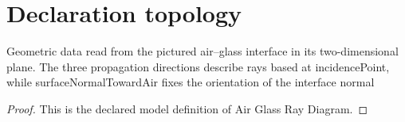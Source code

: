 \section{Declaration topology}
\begin{definition}
  \label{def:physics:phyx-mini-0007:phyxminiproblems-problemphyxmini0007-airglassraydiagram}
  Geometric data read from the pictured air--glass interface in its two-dimensional plane. The three propagation directions describe rays based at incidencePoint, while surfaceNormalTowardAir fixes the orientation of the interface normal
\end{definition}
\begin{proof}
  This is the declared model definition of Air Glass Ray Diagram.
\end{proof}
